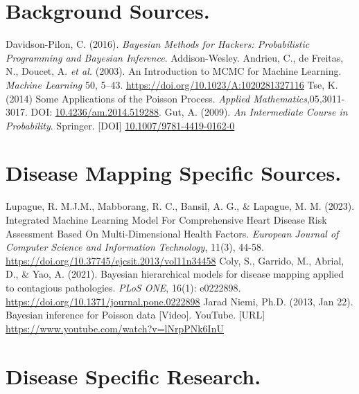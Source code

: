 \documentclass[11pt]{article}
\begin{document}
\begin{thebibliography}{100} %
    \section*{\textbf{Background Sources.}}
     Davidson-Pilon, C. (2016). \emph{Bayesian Methods for Hackers: Probabilistic Programming and Bayesian Inference}. Addison-Wesley. 
    Andrieu, C., de Freitas, N., Doucet, A. \emph{et al.} (2003). An Introduction to MCMC for Machine Learning. \emph{Machine Learning} 50, 5–43.  \url{https://doi.org/10.1023/A:1020281327116}
    Tse, K. (2014) Some Applications of the Poisson Process. \emph{Applied Mathematics},05,3011-3017. DOI:  \url{10.4236/am.2014.519288}.
     Gut, A. (2009). \emph{An Intermediate Course in Probability}. Springer. [DOI] \url{10.1007/9781-4419-0162-0}

    \section*{\textbf{Disease Mapping Specific Sources.}}
    Lupague, R. M.J.M., Mabborang, R. C., Bansil, A. G., \& Lapague, M. M. (2023). Integrated Machine Learning Model For Comprehensive Heart Disease Risk Assessment Based On Multi-Dimensional Health Factors. 
    \emph{European Journal of Computer Science and Information Technology}, 11(3), 44-58. \url{https://doi.org/10.37745/ejcsit.2013/vol11n34458}
    Coly, S., Garrido, M., Abrial, D., \& Yao, A. (2021).
    Bayesian hierarchical models for disease mapping applied to contagious pathologies. \emph{PLoS ONE}, 16(1): e0222898. \url{https://doi.org/10.1371/journal.pone.0222898}
     Jarad Niemi, Ph.D. (2013, Jan 22). Bayesian inference for Poisson data [Video]. YouTube. [URL] \url{https://www.youtube.com/watch?v=lNrpPNk6InU}

    \section*{\textbf{Disease Specific Research.}}

\end{thebibliography}
\end{document}
